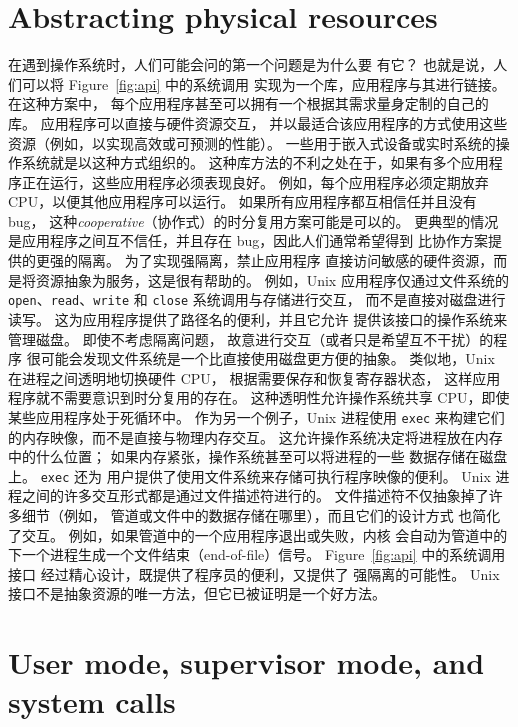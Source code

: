 \section{Abstracting physical resources}

在遇到操作系统时，人们可能会问的第一个问题是为什么要
有它？
也就是说，人们可以将 Figure~\ref{fig:api} 中的系统调用
实现为一个库，应用程序与其进行链接。
在这种方案中，
每个应用程序甚至可以拥有一个根据其需求量身定制的自己的库。
应用程序可以直接与硬件资源交互，
并以最适合该应用程序的方式使用这些资源（例如，以实现高效或可预测的性能）。
一些用于嵌入式设备或实时系统的操作系统就是以这种方式组织的。
这种库方法的不利之处在于，如果有多个应用程序正在运行，这些应用程序必须表现良好。
例如，每个应用程序必须定期放弃 
CPU，以便其他应用程序可以运行。
如果所有应用程序都互相信任并且没有 bug，
这种\textit{cooperative}（协作式）的时分复用方案可能是可以的。
更典型的情况是应用程序之间互不信任，并且存在 bug，因此人们通常希望得到
比协作方案提供的更强的隔离。
为了实现强隔离，禁止应用程序
直接访问敏感的硬件资源，而是将资源抽象为服务，这是很有帮助的。
例如，Unix 应用程序仅通过文件系统的 
\lstinline{open}、\lstinline{read}、\lstinline{write} 和 \lstinline{close} 
系统调用与存储进行交互，
而不是直接对磁盘进行读写。
这为应用程序提供了路径名的便利，并且它允许
提供该接口的操作系统来管理磁盘。
即使不考虑隔离问题，
故意进行交互（或者只是希望互不干扰）的程序
很可能会发现文件系统是一个比直接使用磁盘更方便的抽象。
类似地，Unix 在进程之间透明地切换硬件 CPU，
根据需要保存和恢复寄存器状态，
这样应用程序就不需要意识到时分复用的存在。
这种透明性允许操作系统共享 
CPU，即使某些应用程序处于死循环中。
作为另一个例子，Unix 进程使用 \lstinline{exec} 
来构建它们的内存映像，而不是直接与物理内存交互。
这允许操作系统决定将进程放在内存中的什么位置；
如果内存紧张，操作系统甚至可以将进程的一些
数据存储在磁盘上。
\lstinline{exec} 还为
用户提供了使用文件系统来存储可执行程序映像的便利。
Unix 进程之间的许多交互形式都是通过文件描述符进行的。
文件描述符不仅抽象掉了许多细节（例如，
管道或文件中的数据存储在哪里），而且它们的设计方式
也简化了交互。
例如，如果管道中的一个应用程序退出或失败，内核
会自动为管道中的下一个进程生成一个文件结束（end-of-file）信号。
Figure~\ref{fig:api} 中的系统调用接口
经过精心设计，既提供了程序员的便利，又提供了
强隔离的可能性。
Unix 接口不是抽象资源的唯一方法，但它已被证明是一个好方法。
\section{User mode, supervisor mode, and system calls}

